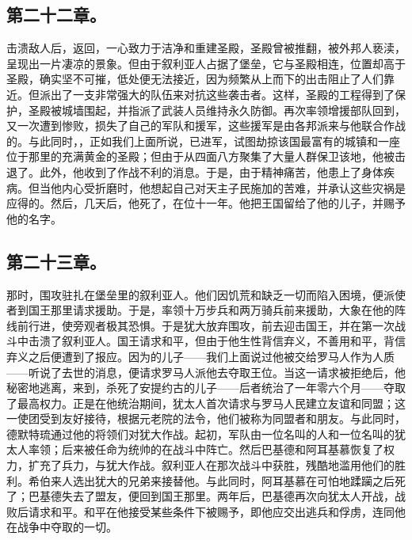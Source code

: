 
\subsection{第二十二章。}

击溃敌人后，返回，一心致力于洁净和重建圣殿，圣殿曾被推翻，被外邦人亵渎，呈现出一片凄凉的景象。但由于叙利亚人占据了堡垒，它与圣殿相连，位置却高于圣殿，确实坚不可摧，低处便无法接近，因为频繁从上而下的出击阻止了人们靠近。但派出了一支非常强大的队伍来对抗这些袭击者。这样，圣殿的工程得到了保护，圣殿被城墙围起，并指派了武装人员维持永久防御。再次率领增援部队回到，又一次遭到惨败，损失了自己的军队和援军，这些援军是由各邦派来与他联合作战的。与此同时，，正如我们上面所说，已进军，试图劫掠该国最富有的城镇和一座位于那里的充满黄金的圣殿；但由于从四面八方聚集了大量人群保卫该地，他被击退了。此外，他收到了作战不利的消息。于是，由于精神痛苦，他患上了身体疾病。但当他内心受折磨时，他想起自己对天主子民施加的苦难，并承认这些灾祸是应得的。然后，几天后，他死了，在位十一年。他把王国留给了他的儿子，并赐予他的名字。\par


\subsection{第二十三章。}

那时，围攻驻扎在堡垒里的叙利亚人。他们因饥荒和缺乏一切而陷入困境，便派使者到国王那里请求援助。于是，率领十万步兵和两万骑兵前来援助，大象在他的阵线前行进，使旁观者极其恐惧。于是犹大放弃围攻，前去迎击国王，并在第一次战斗中击溃了叙利亚人。国王请求和平，但由于他生性背信弃义，不善用和平，背信弃义之后便遭到了报应。因为的儿子——我们上面说过他被交给罗马人作为人质——听说了去世的消息，便请求罗马人派他去夺取王位。当这一请求被拒绝后，他秘密地逃离，来到，杀死了安提约古的儿子——后者统治了一年零六个月——夺取了最高权力。正是在他统治期间，犹太人首次请求与罗马人民建立友谊和同盟；这一使团受到友好接待，根据元老院的法令，他们被称为同盟者和朋友。与此同时，德默特琉通过他的将领们对犹大作战。起初，军队由一位名叫的人和一位名叫的犹太人率领；后来被任命为统帅的在战斗中阵亡。然后巴基德和阿耳基慕恢复了权力，扩充了兵力，与犹大作战。叙利亚人在那次战斗中获胜，残酷地滥用他们的胜利。希伯来人选出犹大的兄弟来接替他。与此同时，阿耳基慕在可怕地蹂躏之后死了；巴基德失去了盟友，便回到国王那里。两年后，巴基德再次向犹太人开战，战败后请求和平。和平在他接受某些条件下被赐予，即他应交出逃兵和俘虏，连同他在战争中夺取的一切。\par

